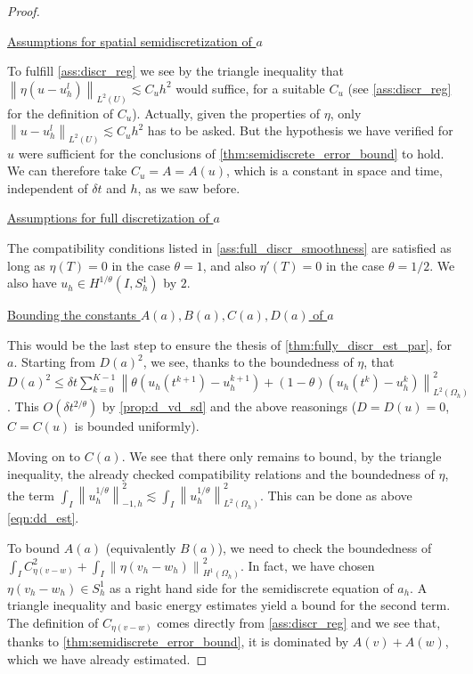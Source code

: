 \documentclass[english,a4paper,10pt,oneside]{scrbook}	%
\theoremstyle{break}
\newenvironment{mproof}[1][\proofname]{%
  \begin{proof}[#1]$ $\par\nobreak\ignorespaces
}{%
  \end{proof}
}
\renewcommand*{\proofname}{Proof}
\theoremstyle{remark}
\newcommand{\ds}{\displaystyle}
\newcommand{\norm}[1]{\left\lVert#1\right\rVert}
\begin{document}
\begin{mproof}
\underline{Assumptions for spatial semidiscretization of $a$}

To fulfill \cref{ass:discr_reg} we see by the triangle inequality that $\norm{\eta(u-u_h^l)}_{L^2(U)}\lesssim C_u h^2$ would suffice, for a suitable $C_u$ (see \cref{ass:discr_reg} for the definition of $C_u$). Actually, given the properties of $\eta$, only $\norm{u-u_h^l}_{L^2(U)}\lesssim C_u h^2$ has to be asked. But the hypothesis we have verified for $u$ were sufficient for the conclusions of \cref{thm:semidiscrete_error_bound} to hold. We can therefore take $C_u = A = A(u)$, which is a constant in space and time, independent of $\delta t$ and $h$, as we saw before.

\underline{Assumptions for full discretization of $a$}

The compatibility conditions listed in \cref{ass:full_discr_smoothness} are satisfied as long as $\eta(T)=0$ in the case $\theta = 1$, and also $\eta'(T)=0$ in the case $\theta=1/2$. We also have $u_h \in H^{1/\theta}(I,S^1_h)$ by $2$.

\underline{Bounding the constants $A(a),B(a),C(a),D(a)$ of $a$}

This would be the last step to ensure the thesis of \cref{thm:fully_discr_est_par}, for $a$. Starting from $D(a)^2$, we see, thanks to the boundedness of $\eta$, that $D(a)^2 \leq \delta t \sum_{k=0}^{K-1}\norm{\theta(u_h(t^{k+1})-u_h^{k+1}) + (1-\theta)(u_h(t^k)-u_h^k)}^2_{L^2(\Omega_h)}$. This $O(\delta t^{2/\theta})$ by \cref{prop:d_vd_sd} and the above reasonings ($D=D(u)=0$, $C=C(u)$ is bounded uniformly).

Moving on to $C(a)$. We see that there only remains to bound, by the triangle inequality, the already checked compatibility relations and the boundedness of $\eta$, the term $\ds \int_I\norm{u_h^{1/\theta}}_{-1,h}^2\lesssim \int_I\norm{u_h^{1/\theta}}_{L^2(\Omega_h)}^2$. This can be done as above \cref{eqn:dd_est}.

To bound $A(a)$ (equivalently $B(a)$), we need to check the boundedness of $\ds \int_IC_{\eta(v-w)}^2 + \int_I \norm{\eta(v_h - w_h)}_{H^1(\Omega_h)}^2$. In fact, we have chosen $\eta(v_h - w_h) \in S^1_h$ as a right hand side for the semidiscrete equation of $a_h$. A triangle inequality and basic energy estimates yield a bound for the second term. The definition of $C_{\eta(v-w)}$ comes directly from \cref{ass:discr_reg} and we see that, thanks to \cref{thm:semidiscrete_error_bound}, it is dominated by $A(v)+A(w)$, which we have already estimated.

\end{mproof}
\end{document}

